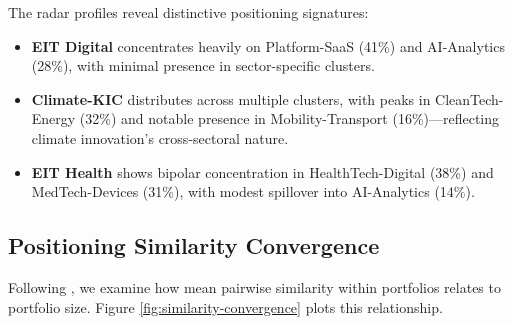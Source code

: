 \documentclass[../main.tex]{subfiles}
\begin{document}
The radar profiles reveal distinctive positioning signatures:
\begin{itemize}
    \item \textbf{EIT Digital} concentrates heavily on Platform-SaaS (41\%) and AI-Analytics (28\%), with minimal presence in sector-specific clusters.
    \item \textbf{Climate-KIC} distributes across multiple clusters, with peaks in CleanTech-Energy (32\%) and notable presence in Mobility-Transport (16\%)---reflecting climate innovation's cross-sectoral nature.
    \item \textbf{EIT Health} shows bipolar concentration in HealthTech-Digital (38\%) and MedTech-Devices (31\%), with modest spillover into AI-Analytics (14\%).
\end{itemize}

\subsection{Positioning Similarity Convergence}

Following \cite{basole2019visual}, we examine how mean pairwise similarity within portfolios relates to portfolio size. Figure \ref{fig:similarity-convergence} plots this relationship.
\end{document}
